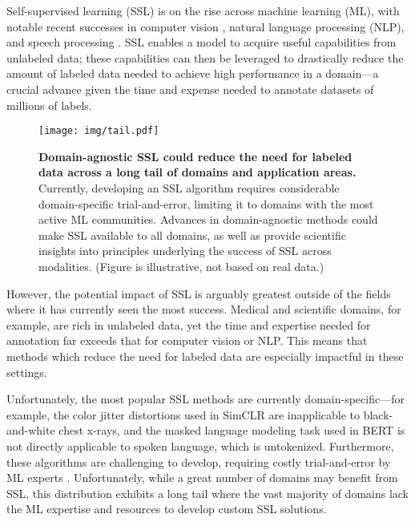 \documentclass{article}
\begin{document}
Self-supervised learning (SSL) is on the rise across machine learning (ML), with notable recent successes in computer vision \citep{Chen2020ASF, He2020MomentumCF, Grill2020BootstrapYO}, natural language processing (NLP), \citep{Devlin2019BERTPO, Yang2019XLNetGA, Clark2020ELECTRAPT} and speech processing \citep{Oord2018RepresentationLW, Baevski2020wav2vec2A}. SSL enables a model to acquire useful capabilities from unlabeled data; these capabilities can then be leveraged to drastically reduce the amount of labeled data needed to achieve high performance in a domain---a crucial advance given the time and expense needed to annotate datasets of millions of labels.

\begin{figure}
    \centering
    \texttt{[image: img/tail.pdf]}
    \caption{\textbf{Domain-agnostic SSL could reduce the need for labeled data across a long tail of domains and application areas.} Currently, developing an SSL algorithm requires considerable domain-specific trial-and-error, limiting it to domains with the most active ML communities. Advances in domain-agnostic methods could make SSL available to all domains, as well as provide scientific insights into principles underlying the success of SSL across modalities. (Figure is illustrative, not based on real data.)}
    \label{fig:longtail}
\end{figure}

However, the potential impact of SSL is arguably greatest outside of the fields where it has currently seen the most success. Medical and scientific domains, for example, are rich in unlabeled data, yet the time and expertise needed for annotation far exceeds that for computer vision or NLP. This means that methods which reduce the need for labeled data are especially impactful in these settings. 

Unfortunately, the most popular SSL methods are currently domain-specific---for example, the color jitter distortions used in SimCLR \citep{Chen2020ASF} are inapplicable to black-and-white chest x-rays, and the masked language modeling task used in BERT \citep{Devlin2019BERTPO} is not directly applicable to spoken language, which is untokenized. Furthermore, these algorithms are challenging to develop, requiring costly trial-and-error by ML experts \citep{Chen2020ASF}. Unfortunately, while a great number of domains may benefit from SSL, this distribution exhibits a long tail where the vast majority of domains lack the ML expertise and resources to develop custom SSL solutions.
\end{document}
